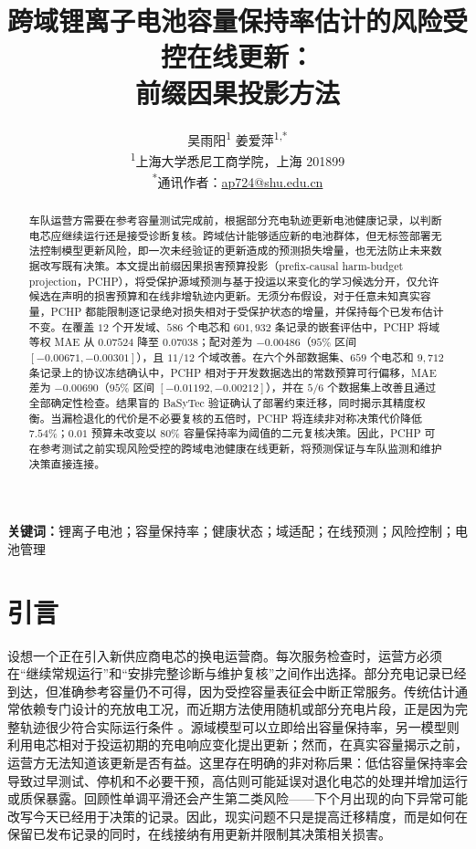 \documentclass[UTF8,11pt]{ctexart}
\title{\textbf{跨域锂离子电池容量保持率估计的风险受控在线更新：\\前缀因果投影方法}}
\author{吴雨阳\textsuperscript{1} \quad 姜爱萍\textsuperscript{1,*}\\[0.45em]
\small\textsuperscript{1}上海大学悉尼工商学院，上海 201899\\
\small\textsuperscript{*}通讯作者：\href{mailto:ap724@shu.edu.cn}{ap724@shu.edu.cn}}
\date{}
\begin{document}
\maketitle

\begin{abstract}
车队运营方需要在参考容量测试完成前，根据部分充电轨迹更新电池健康记录，以判断电芯应继续运行还是接受诊断复核。跨域估计能够适应新的电池群体，但无标签部署无法控制模型更新风险，即一次未经验证的更新造成的预测损失增量，也无法防止未来数据改写既有决策。本文提出前缀因果损害预算投影（prefix-causal harm-budget projection，PCHP），将受保护源域预测与基于投运以来变化的学习候选分开，仅允许候选在声明的损害预算和在线非增轨迹内更新。无须分布假设，对于任意未知真实容量，PCHP 都能限制逐记录绝对损失相对于受保护状态的增量，并保持每个已发布估计不变。在覆盖 $12$ 个开发域、$586$ 个电芯和 $601{,}932$ 条记录的嵌套评估中，PCHP 将域等权 MAE 从 $0.07524$ 降至 $0.07038$；配对差为 $-0.00486$（$95\%$ 区间 $[-0.00671,-0.00301]$），且 $11/12$ 个域改善。在六个外部数据集、$659$ 个电芯和 $9{,}712$ 条记录上的协议冻结确认中，PCHP 相对于开发数据选出的常数预算可行偏移，MAE 差为 $-0.00690$（$95\%$ 区间 $[-0.01192,-0.00212]$），并在 $5/6$ 个数据集上改善且通过全部确定性检查。结果盲的 BaSyTec 验证确认了部署约束迁移，同时揭示其精度权衡。当漏检退化的代价是不必要复核的五倍时，PCHP 将连续非对称决策代价降低 $7.54\%$；$0.01$ 预算未改变以 $80\%$ 容量保持率为阈值的二元复核决策。因此，PCHP 可在参考测试之前实现风险受控的跨域电池健康在线更新，将预测保证与车队监测和维护决策直接连接。
\end{abstract}

\noindent\textbf{关键词：}锂离子电池；容量保持率；健康状态；域适配；在线预测；风险控制；电池管理

\section{引言}

设想一个正在引入新供应商电芯的换电运营商。每次服务检查时，运营方必须在“继续常规运行”和“安排完整诊断与维护复核”之间作出选择。部分充电记录已经到达，但准确参考容量仍不可得，因为受控容量表征会中断正常服务。传统估计通常依赖专门设计的充放电工况，而近期方法使用随机或部分充电片段，正是因为完整轨迹很少符合实际运行条件 \citep{liu2023rapid,zhang2024flexible}。源域模型可以立即给出容量保持率，另一模型则利用电芯相对于投运初期的充电响应变化提出更新；然而，在真实容量揭示之前，运营方无法知道该更新是否有益。这里存在明确的非对称后果：低估容量保持率会导致过早测试、停机和不必要干预，高估则可能延误对退化电芯的处理并增加运行或质保暴露。回顾性单调平滑还会产生第二类风险——下个月出现的向下异常可能改写今天已经用于决策的记录。因此，现实问题不只是提高迁移精度，而是如何在保留已发布记录的同时，在线接纳有用更新并限制其决策相关损害。
\end{document}
